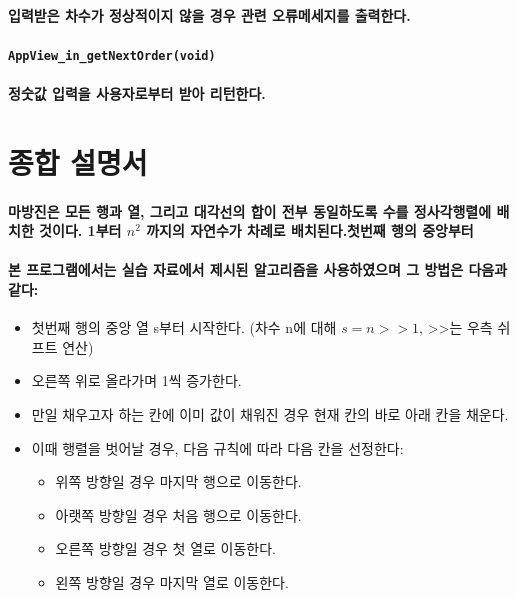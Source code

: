 \documentclass[UTF8]{report}
\begin{document}
            \paragraph{%
                \normalfont 입력받은 차수가 정상적이지 않을 경우 관련 오류메세지를 출력한다.
            }

            \paragraph{\texttt{AppView\_in\_getNextOrder(void)}}
            \paragraph{%
                \normalfont 정숫값 입력을 사용자로부터 받아 리턴한다.
            }


        \section{종합 설명서}

            \paragraph{%
                \normalfont 마방진은 모든 행과 열, 그리고 대각선의 합이 전부 동일하도록 수를 정사각행렬에 배치한 것이다. 1부터 $n^2$ 까지의 자연수가 차례로 배치된다.첫번째 행의 중앙부터 
            }

            \paragraph{%
                \normalfont 본 프로그램에서는 실습 자료에서 제시된 알고리즘을 사용하였으며 그 방법은 다음과 같다:
            }

            \begin{itemize}
                \item 첫번째 행의 중앙 열 s부터 시작한다. (차수 n에 대해 $s = n >> 1$, >>는 우측 쉬프트 연산)
                \item 오른쪽 위로 올라가며 1씩 증가한다.
                \item 만일 채우고자 하는 칸에 이미 값이 채워진 경우 현재 칸의 바로 아래 칸을 채운다.
                \item 이때 행렬을 벗어날 경우, 다음 규칙에 따라 다음 칸을 선정한다:\\
                      \begin{itemize}
                          \item 위쪽 방향일 경우 마지막 행으로 이동한다.
                          \item 아랫쪽 방향일 경우 처음 행으로 이동한다.
                          \item 오른쪽 방향일 경우 첫 열로 이동한다.
                          \item 왼쪽 방향일 경우 마지막 열로 이동한다.
                      \end{itemize}
            \end{itemize}
\end{document}
